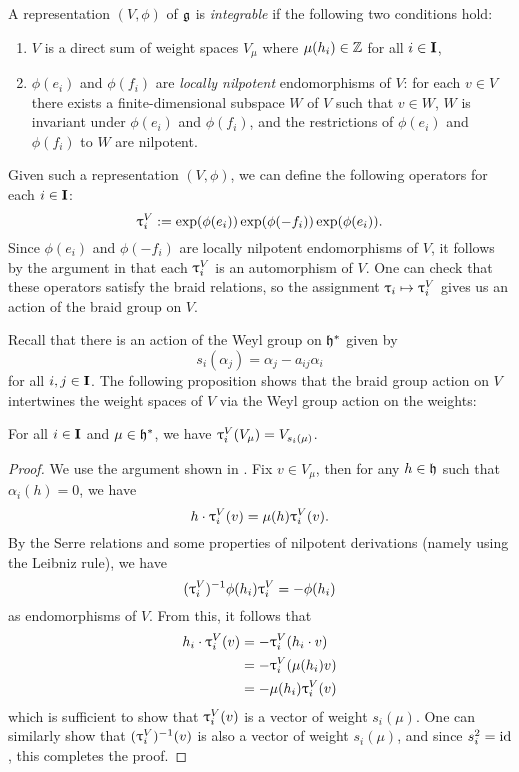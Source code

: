 \begin{definition}\label{D:integrable}
    A representation $(V,\phi)$ of $\mathfrak{g}$ is \emph{integrable} if the following two conditions hold:
    \begin{enumerate}
        \item $V$ is a direct sum of weight spaces $V_\mu$ where $\mu(h_i)\in\mathbb{Z}$ for all $i\in\mathbf{I}$,
        \item $\phi(e_i)$ and $\phi(f_i)$ are \emph{locally nilpotent} endomorphisms of $V$: for each $v\in V$ there exists a finite-dimensional subspace $W$ of $V$ such that $v\in W$, $W$ is invariant under $\phi(e_i)$ and $\phi(f_i)$, and the restrictions of $\phi(e_i)$ and $\phi(f_i)$ to $W$ are nilpotent.
    \end{enumerate}
\end{definition}

Given such a representation $(V,\phi)$, we can define the following operators for each $i\in\mathbf{I}$:
\[\uptau_i^V := \exp(\phi(e_i))\exp(\phi(-f_i))\exp(\phi(e_i)).\]
Since $\phi(e_i)$ and $\phi(-f_i)$ are locally nilpotent endomorphisms of $V$, it follows by the argument in \cite[\S21.2]{humphreys_introduction_1972} that each $\uptau_i^V$ is an automorphism of $V$.
One can check that these operators satisfy the braid relations, so the assignment $\uptau_i\mapsto\uptau_i^V$ gives us an action of the braid group on $V$.

Recall that there is an action of the Weyl group on $\mathfrak{h}^*$ given by
\[s_i(\alpha_j) = \alpha_j - a_{ij}\alpha_i\]
for all $i,j\in\mathbf{I}$.
The following proposition shows that the braid group action on $V$ intertwines the weight spaces of $V$ via the Weyl group action on the weights:

\begin{proposition}\label{P:tau-wt-space}
    For all $i\in\mathbf{I}$ and $\mu\in\mathfrak{h}^*$, we have $\uptau_i^V(V_\mu)=V_{s_i(\mu)}$.
\end{proposition}
\begin{proof}
    We use the argument shown in \cite[\S1.3]{kumar_kac-moody_2002}.
    Fix $v\in V_\mu$, then for any $h\in\mathfrak{h}$ such that $\alpha_i(h)=0$, we have
    \[h\cdot \uptau_i^V(v) = \mu(h)\uptau_i^V(v).\]
    By the Serre relations and some properties of nilpotent derivations (namely using the Leibniz rule), we have
    \[(\uptau_i^V)^{-1}\phi(h_i)\uptau_i^V = -\phi(h_i)\]
    as endomorphisms of $V$.
    From this, it follows that
    \begin{align*}
        h_i\cdot\uptau_i^V(v) &= -\uptau_i^V(h_i\cdot v) \\
        &= -\uptau_i^V(\mu(h_i)v) \\
        &= -\mu(h_i)\uptau_i^V(v)
    \end{align*}
    which is sufficient to show that $\uptau_i^V(v)$ is a vector of weight $s_i(\mu)$.
    One can similarly show that $(\uptau_i^V)^{-1}(v)$ is also a vector of weight $s_i(\mu)$, and since $s_i^2={\operatorname{id}}$, this completes the proof.
\end{proof}

